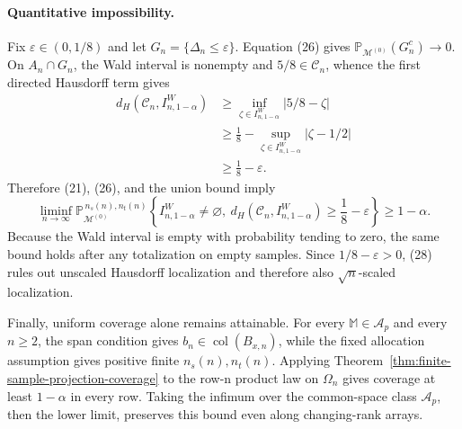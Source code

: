 \paragraph{Quantitative impossibility.}
Fix \(\varepsilon\in(0,1/8)\) and let \(G_n=\{\Delta_n\le\varepsilon\}\).  Equation (26) gives \(\mathbb P_{\mathcal M^{(0)}}(G_n^c)\to0\).  On \(A_n\cap G_n\), the Wald interval is nonempty and \(5/8\in\mathcal C_n\), whence the first directed Hausdorff term gives
\[
\begin{aligned}
d_H(\mathcal C_n,I^W_{n,1-\alpha})
&\ge\inf_{\zeta\in I^W_{n,1-\alpha}}|5/8-\zeta|\\
&\ge\frac18-\sup_{\zeta\in I^W_{n,1-\alpha}}|\zeta-1/2|\\
&\ge\frac18-\varepsilon.
\end{aligned}
\tag{27}
\]
Therefore (21), (26), and the union bound imply
\[
\liminf_{n\to\infty}
\mathbb P_{\mathcal M^{(0)}}^{\,n_s(n),n_t(n)}
\left\{I^W_{n,1-\alpha}\ne\varnothing,\ 
d_H(\mathcal C_n,I^W_{n,1-\alpha})\ge\frac18-\varepsilon\right\}
\ge1-\alpha.
\tag{28}
\]
Because the Wald interval is empty with probability tending to zero, the same bound holds after any totalization on empty samples.  Since \(1/8-\varepsilon>0\), (28) rules out unscaled Hausdorff localization and therefore also \(\sqrt n\)-scaled localization.

Finally, uniform coverage alone remains attainable.  For every \(\mathbb M\in\mathcal A_p\) and every \(n\ge2\), the span condition gives \(b_n\in\operatorname{col}(B_{x,n})\), while the fixed allocation assumption gives positive finite \(n_s(n),n_t(n)\).  Applying Theorem~\ref{thm:finite-sample-projection-coverage} to the row-n product law on \(\Omega_n\) gives coverage at least \(1-\alpha\) in every row.  Taking the infimum over the common-space class \(\mathcal A_p\), then the lower limit, preserves this bound even along changing-rank arrays.